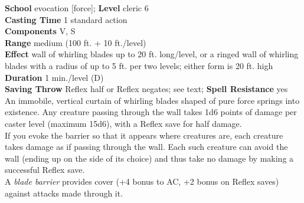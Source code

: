 \textbf{School} evocation [force]; \textbf{Level} cleric 6\\
\textbf{Casting Time} 1 standard action\\
\textbf{Components} V, S\\
\textbf{Range }medium (100 ft. + 10 ft./level)\\
\textbf{Effect }wall of whirling blades up to 20 ft. long/level, or a ringed wall of whirling blades with a radius of up to 5 ft. per two levels; either form is 20 ft. high\\
\textbf{Duration} 1 min./level (D)\\
\textbf{Saving Throw} Reflex half or Reflex negates; see text; \textbf{Spell Resistance} yes\\
An immobile, vertical curtain of whirling blades shaped of pure force springs into existence. Any creature passing through the wall takes 1d6 points of damage per caster level (maximum 15d6), with a Reflex save for half damage.\\
If you evoke the barrier so that it appears where creatures are, each creature takes damage as if passing through the wall. Each such creature can avoid the wall (ending up on the side of its choice) and thus take no damage by making a successful Reflex save.\\
A \textit{blade barrier }provides cover (+4 bonus to AC, +2 bonus on Reflex saves) against attacks made through it.\\
